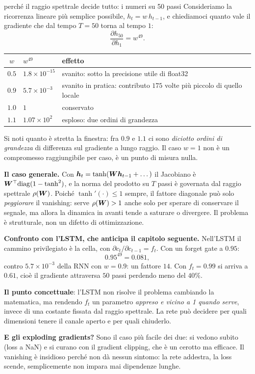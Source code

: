 \begin{esempiosvolto}{perché il raggio spettrale decide tutto: i numeri su 50 passi}
Consideriamo la ricorrenza lineare più semplice possibile, $h_t = w\, h_{t-1}$, e chiediamoci quanto vale il gradiente che dal tempo $T = 50$ torna al tempo $1$:
\[
\frac{\partial h_{50}}{\partial h_1} = w^{49}.
\]

\begin{center}
\begin{tabular}{cll}
\toprule
$w$ & $w^{49}$ & effetto \\
\midrule
$0.5$ & $1.8 \times 10^{-15}$ & svanito: sotto la precisione utile di float32 \\
$0.9$ & $5.7 \times 10^{-3}$ & svanito in pratica: contributo $175$ volte più piccolo di quello locale \\
$1.0$ & $1$ & conservato \\
$1.1$ & $1.07 \times 10^{2}$ & esploso: due ordini di grandezza \\
\bottomrule
\end{tabular}
\end{center}

Si noti quanto è stretta la finestra: fra $0.9$ e $1.1$ ci sono \emph{diciotto ordini di grandezza} di differenza sul gradiente a lungo raggio. Il caso $w = 1$ non è un compromesso raggiungibile per caso, è un punto di misura nulla.

\medskip
\textbf{Il caso generale.} Con $\bm{h}_t = \tanh(\bm{W}\bm{h}_{t-1} + \dots)$ il Jacobiano è $\bm{W}^\top \mathrm{diag}(1 - \tanh^2)$, e la norma del prodotto su $T$ passi è governata dal raggio spettrale $\rho(\bm{W})$. Poiché $\tanh'(\cdot) \leq 1$ sempre, il fattore diagonale può solo \emph{peggiorare} il vanishing: serve $\rho(\bm{W}) > 1$ anche solo per sperare di conservare il segnale, ma allora la dinamica in avanti tende a saturare o divergere. Il problema è strutturale, non un difetto di ottimizzazione.

\medskip
\textbf{Confronto con l'LSTM, che anticipa il capitolo seguente.} Nell'LSTM il cammino privilegiato è la cella, con $\partial c_t / \partial c_{t-1} = f_t$. Con un forget gate a $0.95$:
\[
0.95^{49} = 0.081,
\]
contro $5.7\times 10^{-3}$ della RNN con $w = 0.9$: un fattore $14$. Con $f_t = 0.99$ si arriva a $0.61$, cioè il gradiente attraversa $50$ passi perdendo meno del $40\%$.

\textbf{Il punto concettuale}: l'LSTM non risolve il problema cambiando la matematica, ma rendendo $f_t$ un parametro \emph{appreso e vicino a 1 quando serve}, invece di una costante fissata dal raggio spettrale. La rete può decidere per quali dimensioni tenere il canale aperto e per quali chiuderlo.

\textbf{E gli exploding gradients?} Sono il caso più facile dei due: si vedono subito (loss a NaN) e si curano con il gradient clipping, che è un cerotto ma efficace. Il vanishing è insidioso perché non dà nessun sintomo: la rete addestra, la loss scende, semplicemente non impara mai dipendenze lunghe.
\end{esempiosvolto}

